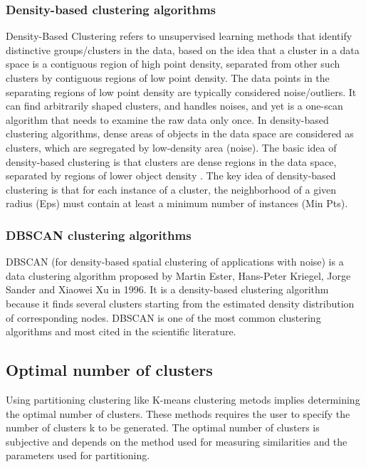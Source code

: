 \subsubsection{Density-based clustering algorithms}
\label{subsub:density_based_c}
Density-Based Clustering refers to  unsupervised learning methods that identify distinctive groups/clusters in the data, based on the idea that a cluster in a data space is a contiguous region of high point density, separated from other such clusters by contiguous regions of low point density. The data points in the separating regions of low point density are typically considered noise/outliers.
It can find arbitrarily shaped clusters, and handles noises, and yet is a one-scan algorithm that needs to examine the raw data only once. In density-based clustering algorithms, dense areas of objects in the data space are considered as clusters, which are segregated by low-density area (noise). The basic idea of density-based clustering is that clusters are dense regions in the data space, separated by regions of lower object density .
The key idea of density-based clustering is that for each instance of a cluster, the neighborhood of a given radius (Eps) must contain at least a minimum number of instances (Min Pts).

\subsubsection{DBSCAN clustering algorithms}
\label{subsub:dbscan}
DBSCAN (for density-based spatial clustering of applications with noise) is a data clustering algorithm proposed by Martin Ester, Hans-Peter Kriegel, Jorge Sander and Xiaowei Xu in 1996. It is a density-based clustering algorithm because it finds several clusters starting from the estimated density distribution of corresponding nodes. DBSCAN \cite{Kisilevich2010PDBSCANAD} is one of the most common clustering algorithms and most cited in the scientific literature.

\subsection{Optimal number of clusters}

Using partitioning clustering like K-means clustering metods implies  determining the optimal number of clusters. These methods  requires the user to specify the number of clusters k to be generated. The optimal number of clusters is subjective and depends on the method used for measuring similarities and the parameters used for partitioning.

